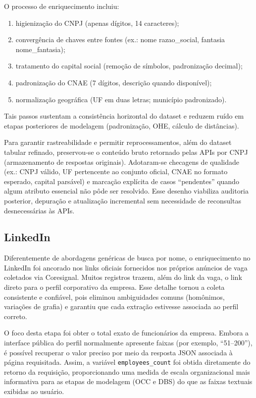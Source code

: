 O processo de enriquecimento incluiu:
\begin{enumerate}
    \item higienização do CNPJ (apenas dígitos, 14 caracteres);
    \item convergência de chaves entre fontes (ex.: nome  razao\_social, fantasia  nome\_fantasia);
    \item tratamento do capital social (remoção de símbolos, padronização decimal);
    \item padronização do CNAE (7 dígitos, descrição quando disponível);
    \item normalização geográfica (UF em duas letras; município padronizado).
\end{enumerate}

Tais passos sustentam a consistência horizontal do dataset e reduzem ruído em etapas posteriores de modelagem (padronização, OHE, cálculo de distâncias).

Para garantir rastreabilidade e permitir reprocessamentos, além do dataset tabular refinado, preservou-se o conteúdo bruto retornado pelas APIs por CNPJ (armazenamento de respostas originais). Adotaram-se checagens de qualidade (ex.: CNPJ válido, UF pertencente ao conjunto oficial, CNAE no formato esperado, capital parsável) e marcação explícita de casos “pendentes” quando algum atributo essencial não pôde ser resolvido. Esse desenho viabiliza auditoria posterior, depuração e atualização incremental sem necessidade de reconsultas desnecessárias às APIs.

\subsection{\textbf{LinkedIn}}

Diferentemente de abordagens genéricas de busca por nome, o enriquecimento no LinkedIn foi ancorado nos links oficiais fornecidos nos próprios anúncios de vaga coletados via Coresignal. Muitos registros trazem, além do link da vaga, o link direto para o perfil corporativo da empresa. Esse detalhe tornou a coleta consistente e confiável, pois eliminou ambiguidades comuns (homônimos, variações de grafia) e garantiu que cada extração estivesse associada ao perfil correto.

O foco desta etapa foi obter o total exato de funcionários da empresa. Embora a interface pública do perfil normalmente apresente faixas (por exemplo, ``51--200''), é possível recuperar o valor preciso por meio da resposta JSON associada à página requisitada. Assim, a variável \texttt{employees\_count} foi obtida diretamente do retorno da requisição, proporcionando uma medida de escala organizacional mais informativa para as etapas de modelagem (OCC e DBS) do que as faixas textuais exibidas ao usuário.


